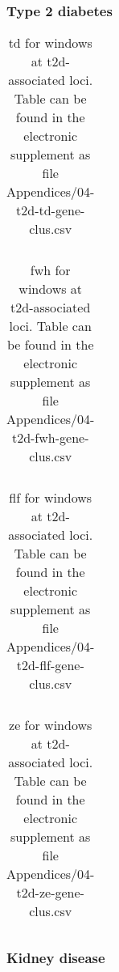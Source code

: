 \documentclass[]{report}
\begin{document}
\begin{appendices}
\FloatBarrier

\subsubsection{Type 2 diabetes}\label{type-2-diabetes}

\begin{table}[!htb]
\caption[\gls{td} for windows at \gls{t2d}-associated loci.]{\gls{td} for windows at \gls{t2d}-associated loci. Table can be found in the electronic supplement as file Appendices/04-t2d-td-gene-clus.csv}
\centering
  \begin{tabular}{l l}
  \end{tabular}
  \label{tab:t2dtdgeneclus}
\end{table}

\begin{table}[!htb]
\caption[\gls{fwh} for windows at \gls{t2d}-associated loci.]{\gls{fwh} for windows at \gls{t2d}-associated loci. Table can be found in the electronic supplement as file Appendices/04-t2d-fwh-gene-clus.csv}
\centering
  \begin{tabular}{l l}
  \end{tabular}
  \label{tab:t2dfwhgeneclus}
\end{table}

\begin{table}[!htb]
\caption[\gls{flf} for windows at \gls{t2d}-associated loci.]{\gls{flf} for windows at \gls{t2d}-associated loci. Table can be found in the electronic supplement as file Appendices/04-t2d-flf-gene-clus.csv}
\centering
  \begin{tabular}{l l}
  \end{tabular}
  \label{tab:t2dflfgeneclus}
\end{table}

\begin{table}[!htb]
\caption[\gls{ze} for windows at \gls{t2d}-associated loci.]{\gls{ze} for windows at \gls{t2d}-associated loci. Table can be found in the electronic supplement as file Appendices/04-t2d-ze-gene-clus.csv}
\centering
  \begin{tabular}{l l}
  \end{tabular}
  \label{tab:t2dzegeneclus}
\end{table}

\FloatBarrier

\subsubsection{Kidney disease}\label{kidney-disease}


\end{appendices}
\end{document}
